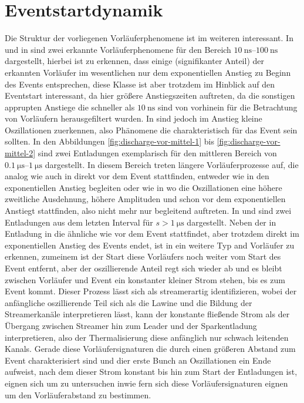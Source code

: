 \section{Eventstartdynamik}
\label{sec:event_startdynamik}


Die Struktur der vorliegenen Vorläuferphenomene ist im weiteren interessant. In  und in  sind zwei erkannte Vorläuferphenomene für den Bereich \(\SIrange{10}{100}{\nano\second}\) dargestellt, hierbei ist zu erkennen, dass einige (signifikanter Anteil) der erkannten Vorläufer im wesentlichen nur dem exponentiellen Anstieg zu Beginn des Events entsprechen, diese Klasse ist aber trotzdem im Hinblick auf den Eventstart interessant, da hier größere Anstiegszeiten auftreten, da die sonstigen apprupten Anstiege die schneller als \(\SI{10}{\nano\second}\) sind von vorhinein für die Betrachtung von Vorläufern herausgefiltert wurden. In  sind jedoch im Anstieg kleine Oszillationen zuerkennen, also Phänomene die charakteristisch für das Event sein sollten. In den Abbildungen \ref{fig:discharge-vor-mittel-1} bis \ref{fig:discharge-vor-mittel-2} sind zwei Entladungen exemplarisch für den mittleren Bereich von \(\SIrange{0,1}{1}{\micro\second}\) dargestellt. In diesem Bereich treten längere Vorläuferprozesse auf, die analog wie auch in  direkt vor dem Event stattfinden, entweder wie in  den exponentiellen Anstieg begleiten oder wie in  wo die Oszillationen eine höhere zweitliche Ausdehnung, höhere Amplituden und schon vor dem exponentiellen Anstiegt stattfinden, also nicht mehr nur begleitend auftreten. In  und  sind zwei Entladungen aus dem letzten Interval für \(s > \SI{1}{\micro\second}\) dargestellt. Neben der in Entladung in  die ähnliche wie  vor dem Event stattfindet, aber trotzdem direkt im exponentiellen Anstieg des Events endet, ist in  ein weitere Typ and Vorläufer zu erkennen, zumeinem ist der Start diese Vorläufers noch weiter vom Start des Event entfernt, aber der oszillierende Anteil regt sich wieder ab und es bleibt zwischen Vorläufer und Event ein konstanter kleiner Strom stehen, bis es zum Event kommt. Dieser Prozess lässt sich als streamerartig identifizieren, wobei der anfängliche oszillierende Teil sich als die Lawine und die Bildung der Streamerkanäle interpretieren lässt, kann der konstante fließende Strom als der Übergang zwischen Streamer hin zum Leader und der Sparkentladung interpretieren, also der Thermalisierung diese anfänglich nur schwach leitenden Kanals. Gerade diese Vorläufersignaturen die durch einen größeren Abstand zum Event charakterisiert sind und dier erste Bunch an Oszillationen ein Ende aufweist, nach dem dieser Strom konstant bis hin zum Start der Entladungen ist, eignen sich um zu untersuchen inwie fern sich diese Vorläufersignaturen eignen um den Vorläuferabstand zu bestimmen. 

